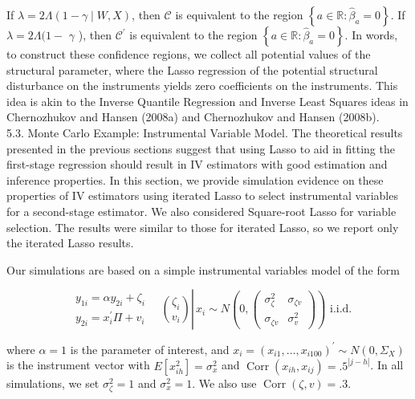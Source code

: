 \documentclass[10pt]{article}
\begin{document}
If \(\lambda=2 \Lambda(1-\gamma \mid W, X)\), then \(\mathcal{C}\) is equivalent to the region \(\left\{a \in \mathbb{R}: \widehat{\beta}_{a}=0\right\}\). If \(\lambda=2 \Lambda(1-\) \(\gamma\) ), then \(\mathcal{C}^{\prime}\) is equivalent to the region \(\left\{a \in \mathbb{R}: \widehat{\beta}_{a}=0\right\}\). In words, to construct these confidence regions, we collect all potential values of the structural parameter, where the Lasso regression of the potential structural disturbance on the instruments yields zero coefficients on the instruments. This idea is akin to the Inverse Quantile Regression and Inverse Least Squares ideas in Chernozhukov and Hansen (2008a) and Chernozhukov and Hansen (2008b).\\
5.3. Monte Carlo Example: Instrumental Variable Model. The theoretical results presented in the previous sections suggest that using Lasso to aid in fitting the first-stage regression should result in IV estimators with good estimation and inference properties. In this section, we provide simulation evidence on these properties of IV estimators using iterated Lasso to select instrumental variables for a second-stage estimator. We also considered Square-root Lasso for variable selection. The results were similar to those for iterated Lasso, so we report only the iterated Lasso results.

Our simulations are based on a simple instrumental variables model of the form

\[
\left.\begin{aligned}
& y_{1 i}=\alpha y_{2 i}+\zeta_{i} \\
& y_{2 i}=x_{i}^{\prime} \Pi+v_{i}
\end{aligned} \quad\binom{\zeta_{i}}{v_{i}} \right\rvert\, x_{i} \sim N\left(0,\left(\begin{array}{cc}
\sigma_{\zeta}^{2} & \sigma_{\zeta v} \\
\sigma_{\zeta v} & \sigma_{v}^{2}
\end{array}\right)\right) \text { i.i.d. }
\]

where \(\alpha=1\) is the parameter of interest, and \(x_{i}=\left(x_{i 1}, \ldots, x_{i 100}\right)^{\prime} \sim N\left(0, \Sigma_{X}\right)\) is the instrument vector with \(E\left[x_{i h}^{2}\right]=\sigma_{x}^{2}\) and \(\operatorname{Corr}\left(x_{i h}, x_{i j}\right)=.5^{|j-h|}\). In all simulations, we set \(\sigma_{\zeta}^{2}=1\) and \(\sigma_{x}^{2}=1\). We also use \(\operatorname{Corr}(\zeta, v)=.3\).
\end{document}
